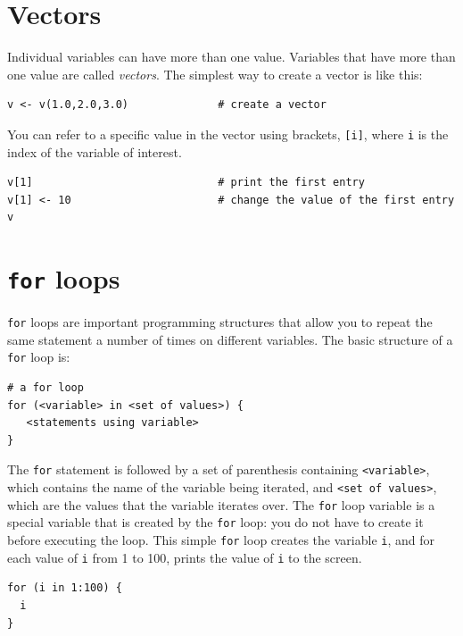 \section*{Vectors}
Individual variables can have more than one value.
Variables that have more than one value are called \emph{vectors}.
The simplest way to create a vector is like this:
{\tt \begin{snugshade*}
\begin{lstlisting}    
v <- v(1.0,2.0,3.0)              # create a vector
\end{lstlisting}
\end{snugshade*}}
\noindent You can refer to a specific value in the vector using brackets, \texttt{[i]}, where \texttt{i} is the index of the variable of interest.
{\tt \begin{snugshade*}
\begin{lstlisting}    
v[1]                             # print the first entry
v[1] <- 10                       # change the value of the first entry
v
\end{lstlisting}
\end{snugshade*}}

\section*{\texttt{for} loops}
\texttt{for} loops are important programming structures that allow you to repeat the same statement a number of times on different variables.
The basic structure of a \texttt{for} loop is:
{\tt \begin{snugshade*}
\begin{lstlisting}    
# a for loop
for (<variable> in <set of values>) {
   <statements using variable>
}
\end{lstlisting}
\end{snugshade*}}
\noindent The \texttt{for} statement is followed by a set of parenthesis containing \texttt{<variable>}, which contains the name of the variable being iterated, and \texttt{<set of values>}, which are the values that the variable iterates over.
The \texttt{for} loop variable is a special variable that is created by the \texttt{for} loop: you do not have to create it before executing the loop.
This simple \texttt{for} loop creates the variable \texttt{i}, and for each value of \texttt{i} from 1 to 100, prints the value of \texttt{i} to the screen.
{\tt \begin{snugshade*}
\begin{lstlisting}    
for (i in 1:100) {
  i
}
\end{lstlisting}
\end{snugshade*}}

